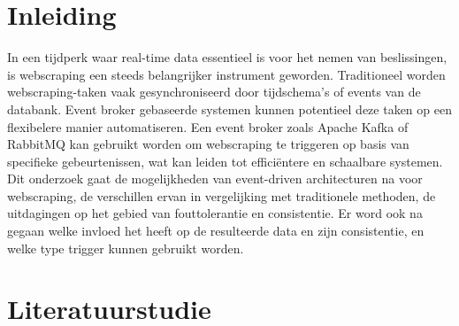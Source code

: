 


% 

\section{Inleiding}%
\label{sec:inleiding}

In een tijdperk waar real-time data essentieel is voor het nemen van beslissingen, is webscraping een steeds belangrijker instrument geworden. Traditioneel worden webscraping-taken vaak gesynchroniseerd door tijdschema's of events van de databank. Event broker gebaseerde systemen kunnen potentieel deze taken op een flexibelere manier automatiseren. Een event broker zoals Apache Kafka of RabbitMQ kan gebruikt worden om webscraping te triggeren op basis van specifieke gebeurtenissen, wat kan leiden tot efficiëntere en schaalbare systemen. Dit onderzoek gaat de mogelijkheden van event-driven architecturen na voor webscraping, de verschillen ervan in vergelijking met traditionele methoden, de uitdagingen op het gebied van fouttolerantie en consistentie. Er word ook na gegaan welke invloed het heeft op de resulteerde data en zijn consistentie, en welke type trigger kunnen gebruikt worden.


\section{Literatuurstudie}%
\label{sec:literatuurstudie}


